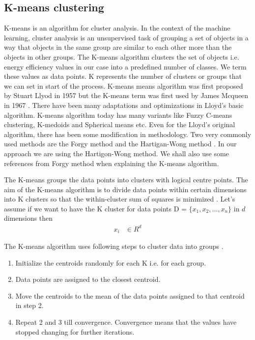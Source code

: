 \subsection{K-means clustering}
K-means is an algorithm for cluster analysis. In the context of the machine learning, cluster analysis is an unsupervised task of grouping a set of objects in a way that objects in the same group are similar to each other more than the objects in other groups. The K-means algorithm clusters the set of objects i.e. energy efficiency values in our case into a predefined number of classes. We term these values as data points. K represents the number  of clusters or groups that we can set in start of the process. K-means means algorithm was first proposed by Stuart Llyod in 1957 \cite{lloyd1982least} but the K-means term was first used by James Mcqueen in 1967 \cite{macqueen1967some}. There have been many  adaptations and optimizations in Lloyd's basic algorithm. K-means algorithm today has many variants like Fuzzy C-means clustering, K-medoids and Spherical means etc. Even for the Lloyd's original algorithm, there has been some modification in methodology. Two very commonly used methods are the Forgy method \cite{forgy1965cluster} and the Hartigan-Wong method \cite{hartigan1979algorithm}. In our approach we are using the Hartigon-Wong method. We shall also use some references from Forgy method when explaining the K-means algorithm. 

The K-means groups the data points into clusters with logical centre points. The aim of the K-means algorithm is to divide data points within certain dimensions into K clusters so that the within-cluster sum of squares is minimized \cite{hartigan1979algorithm}. Let's assume if we want to have the K cluster for data points  D = \(\{x_1,x_2,\dotsc,x_n\}\) in \(d\) dimensions then
\begin{align*}
x_{i}& \in R ^{d}
\end{align*}
 
The K-means algorithm uses following steps to cluster data into groups \cite{ng2000cs229}.
\begin{enumerate}
  \item Initialize the centroids randomly for each K i.e. for each group. 
  \item Data points are assigned to the closest centroid.
  \item Move the centroids to the mean of the data points assigned to that centroid in step 2.
  \item Repeat 2 and 3 till convergence. Convergence means that the values have stopped changing for further iterations.
\end{enumerate} 

